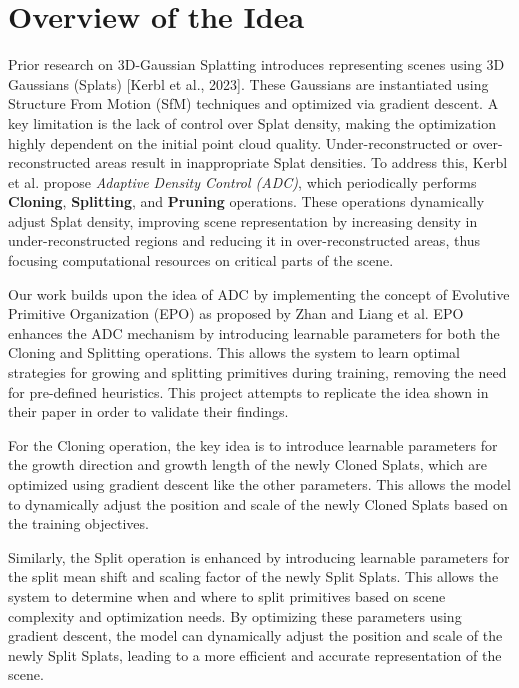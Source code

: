 \documentclass[11pt]{report}
\begin{document}
\section{Overview of the Idea}

Prior research on 3D-Gaussian Splatting introduces representing scenes using 3D Gaussians (Splats) [Kerbl et al., 2023]. These Gaussians are instantiated using Structure From Motion (SfM) techniques and optimized via gradient descent. A key limitation is the lack of control over Splat density, making the optimization highly dependent on the initial point cloud quality. Under-reconstructed or over-reconstructed areas result in inappropriate Splat densities. To address this, Kerbl et al. propose \emph{Adaptive Density Control (ADC)}, which periodically performs \textbf{Cloning}, \textbf{Splitting}, and \textbf{Pruning} operations. These operations dynamically adjust Splat density, improving scene representation by increasing density in under-reconstructed regions and reducing it in over-reconstructed areas, thus focusing computational resources on critical parts of the scene.

Our work builds upon the idea of ADC by implementing the concept of Evolutive Primitive Organization (EPO) as proposed by Zhan and Liang et al. EPO enhances the ADC mechanism by introducing learnable parameters for both the Cloning and Splitting operations. This allows the system to learn optimal strategies for growing and splitting primitives during training, removing the need for pre-defined heuristics. This project attempts to replicate the idea shown in their paper in order to validate their findings.

For the Cloning operation, the key idea is to introduce learnable parameters for the growth direction and growth length of the newly Cloned Splats, which are optimized using gradient descent like the other parameters. This allows the model to dynamically adjust the position and scale of the newly Cloned Splats based on the training objectives.

Similarly, the Split operation is enhanced by introducing learnable parameters for the split mean shift and scaling factor of the newly Split Splats. This allows the system to determine when and where to split primitives based on scene complexity and optimization needs. By optimizing these parameters using gradient descent, the model can dynamically adjust the position and scale of the newly Split Splats, leading to a more efficient and accurate representation of the scene.
\end{document}
